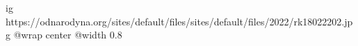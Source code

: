  
 
 
 
 

\ifcmt
  ig https://odnarodyna.org/sites/default/files/sites/default/files/2022/rk18022202.jpg
  @wrap center
  @width 0.8
\fi
